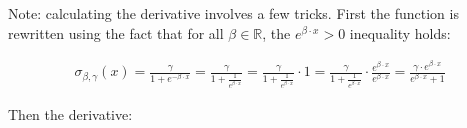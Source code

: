 \documentclass{article}
\begin{document}
          Note: calculating the derivative involves a few tricks. First the
          function is rewritten using the fact that for all
          $\beta \in \mathbb{R}$, the $e^{\beta \cdot x} > 0$ inequality holds:

          \begin{align*}
            \sigma_{\beta, \gamma} (x)
              = \frac{\gamma}{1 + e^{- \beta \cdot x}}
              = \frac{\gamma}{1 + \frac{1}{e^{\beta \cdot x}}}
              = \frac{\gamma}{1 + \frac{1}{e^{\beta \cdot x}}} \cdot 1
              = \frac{\gamma}{1 + \frac{1}{e^{\beta \cdot x}}}
                \cdot
                \frac{e^{\beta \cdot x}}{e^{\beta \cdot x}}
              = \frac{\gamma \cdot e^{\beta \cdot x}}{e^{\beta \cdot x} + 1}
          \end{align*}

          Then the derivative:
\end{document}
